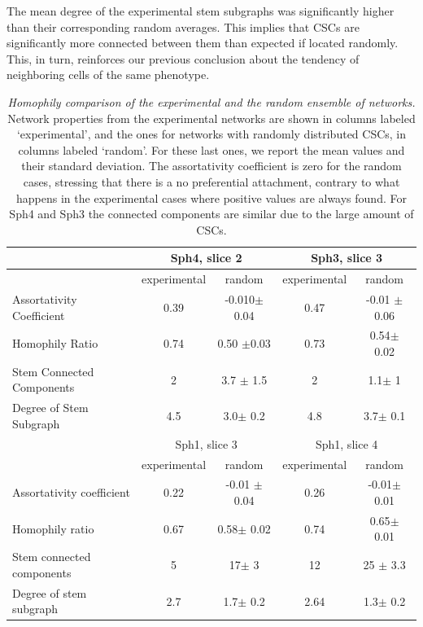 \documentclass[fleqn,10pt]{wlscirep}
\begin{document}
The mean degree of the experimental stem subgraphs was significantly higher than their corresponding random averages. This implies that CSCs are significantly more connected between them than expected if located randomly. This, in turn, reinforces our previous conclusion about the tendency of neighboring cells of the same phenotype. 
% 



\begin{table}[htbp]
\centering
\begin{tabular}{|l|c|c|c|c|}
\hline
 & \multicolumn{2}{|c|}{\textsf{ Sph4, slice 2}}  &  \multicolumn{2}{|c|}{\textsf{ Sph3, slice 3}}\\
\hline
 &experimental &random& experimental & random\\
\hline
Assortativity Coefficient &
0.39 & -0.010$\pm$ 0.04& 0.47 & -0.01 $\pm$ 0.06 \\
\hline
Homophily Ratio &  0.74&0.50 $\pm$0.03&0.73&  0.54$\pm$  0.02  \\
\hline
Stem Connected Components &2& 3.7 $\pm$ 1.5 &2&  1.1$\pm$  1 \\
\hline
Degree of Stem Subgraph &4.5& 3.0$\pm$ 0.2  &4.8& 3.7$\pm$ 0.1\\
\hline
\hline
\hline
 & \multicolumn{2}{|c|}{\textsf{ Sph1, slice 3}} & \multicolumn{2}{|c|}{\textsf{ Sph1, slice 4}}  \\
\hline
 & experimental & random& experimental&random \\
\hline
Assortativity coefficient &0.22 & -0.01 $\pm$ 0.04   &0.26& -0.01$\pm$ 0.01  \\
\hline
Homophily ratio  &0.67& 0.58$\pm$ 0.02 &0.74& 0.65$\pm$  0.01 \\
\hline
Stem connected components &5& 17$\pm$ 3 &12& 25 $\pm$ 3.3 \\
\hline
Degree of stem subgraph &2.7& 1.7$\pm$ 0.2 & 2.64 & 1.3$\pm$ 0.2  \\
\hline

\end{tabular}
\caption{\emph{Homophily comparison of the experimental and the random ensemble of networks.} Network properties from the experimental networks are shown in columns labeled `experimental', and the ones for networks with randomly distributed CSCs, in columns labeled `random'. For these last ones, we report the mean values and their standard deviation. The assortativity coefficient is zero for the random cases, stressing that there is a no preferential attachment, contrary to what happens in the experimental cases where positive values are always found. For \textsf{ Sph4} and \textsf{ Sph3} the connected components are similar due to the large amount of CSCs. }
\label{tab: ensemble statistics}
\end{table}
\end{document}
